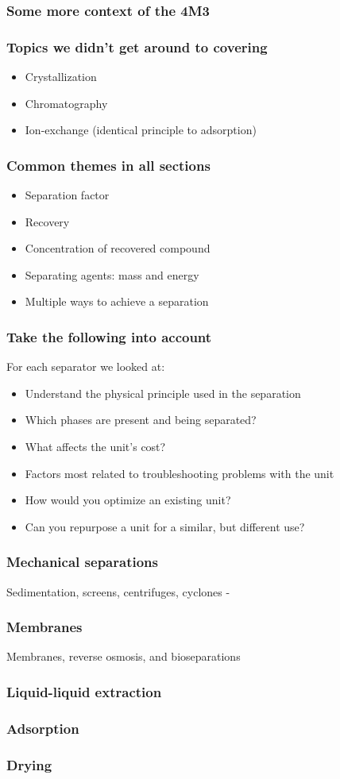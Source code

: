 \begin{frame}\frametitle{Some more context of the 4M3}
\end{frame}

\begin{frame}\frametitle{Topics we didn't get around to covering}
	\begin{itemize}
		\item	Crystallization
		\item	Chromatography
		\item	Ion-exchange (identical principle to adsorption)
	\end{itemize}
\end{frame}

\begin{frame}\frametitle{Common themes in all sections}
	\begin{itemize}
		\item	Separation factor
		\item	Recovery
		\item	Concentration of recovered compound
		\item	Separating agents: mass and energy
		\item	Multiple ways to achieve a separation
	\end{itemize}
\end{frame}

\begin{frame}\frametitle{Take the following into account}
	For each separator we looked at:
	\begin{itemize}
		\item	Understand the physical principle used in the separation
		\item	Which phases are present and being separated?
		\item	What affects the unit's cost?
		\item	Factors most related to troubleshooting problems with the unit
		\item	How would you optimize an existing unit?
		\item	Can you repurpose a unit for a similar, but different use?
	\end{itemize}
\end{frame}

\begin{frame}\frametitle{Mechanical separations}
	Sedimentation, screens, centrifuges, cyclones - 
\end{frame}

\begin{frame}\frametitle{Membranes}
	Membranes, reverse osmosis, and bioseparations
\end{frame}

\begin{frame}\frametitle{Liquid-liquid extraction}

\end{frame}

\begin{frame}\frametitle{Adsorption}
	
\end{frame}

\begin{frame}\frametitle{Drying}
	
\end{frame}